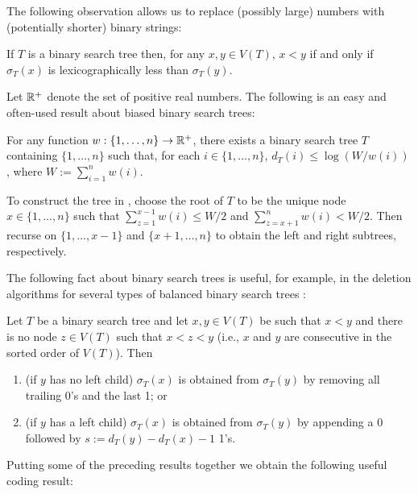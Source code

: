 \documentclass[kpfonts]{patmorin}
\begin{document}
The following observation allows us to replace (possibly large) numbers with (potentially shorter) binary strings:

\begin{obs}
  If $T$ is a binary search tree then, for any $x,y\in V(T)$, $x<y$ if and only if $\sigma_T(x)$ is lexicographically less than $\sigma_T(y)$.
\end{obs}

Let $\mathbb{R}^+$ denote the set of positive real numbers. The following is an easy and often-used result about biased binary search trees:

\begin{lem}
  For any function $w:\{1,\ldots,n\}\to\mathbb{R}^+$, there exists a binary search tree $T$ containing $\{1,\ldots,n\}$ such that, for each $i\in\{1,\ldots,n\}$, $d_T(i)\le\log(W/w(i))$, where $W:=\sum_{i=1}^n w(i)$.
\end{lem}

To construct the tree in , choose the root of $T$ to be the unique node $x\in\{1,\ldots,n\}$ such that $\sum_{z=1}^{x-1} w(i)\le W/2$ and $\sum_{z=x+1}^{n} w(i)< W/2$.  Then recurse on $\{1,\ldots,x-1\}$ and $\{x+1,\ldots,n\}$ to obtain the left and right subtrees, respectively.

The following fact about binary search trees is useful, for example, in the deletion algorithms for several types of balanced binary search trees \cite[Section~6.2.3]{morin:open}:

\begin{lem}
  Let $T$ be a binary search tree and let $x,y\in V(T)$ be such that $x<y$ and there is no node $z\in V(T)$ such that $x<z<y$ (i.e., $x$ and $y$ are consecutive in the sorted order of $V(T)$).  Then
  \begin{enumerate}
    \item (if $y$ has no left child) $\sigma_T(x)$ is obtained from $\sigma_T(y)$ by removing all trailing 0's and the last 1; or
    \item (if $y$ has a left child) $\sigma_T(x)$ is obtained from $\sigma_T(y)$ by appending a 0 followed by $s:=d_T(y)-d_T(x)-1$ 1's.
  \end{enumerate}
\end{lem}

Putting some of the preceding results together we obtain the following useful coding result:
\end{document}
